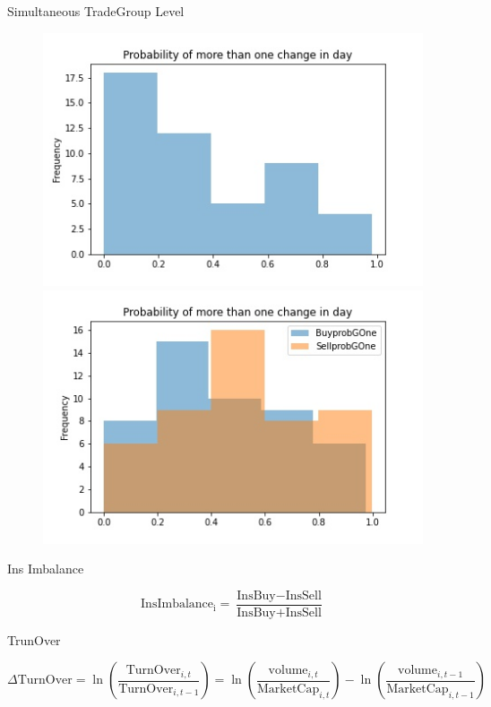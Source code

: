 \documentclass{beamer}
\begin{document}
	\begin{frame}{Simultaneous Trade}{Group Level}
		
		\begin{figure}
			\centering
			\includegraphics[width=0.45\linewidth]{../Trade/MorethanOneProb}
			\includegraphics[width=0.45\linewidth]{../Trade/Buy-SellMorethanOneProb}
			
			\label{fig:morethanoneprob}
		\end{figure}
		
	\end{frame}
	
	
	\begin{frame}{Ins Imbalance}

			 \begin{equation*}
				 \text{InsImbalance}_\text{i} = \frac{\text{InsBuy} - \text{InsSell}}{\text{InsBuy} + \text{InsSell}}
			\end{equation*}

				\begin{table}[htbp]
			\centering
			\resizebox{1\textheight}{!}{
				
			}
		\end{table}
	
	\end{frame}
	\begin{frame}{TrunOver}
	
	\begin{equation*}
		\Delta \text{TurnOver} = \ln(\frac{\text{TurnOver}_{i,t}}{\text{TurnOver}_{i,t-1}}) = 
		\ln({\frac{\text{volume}_{i,t}}{\text{MarketCap}_{i,t}}}) - \ln({\frac{\text{volume}_{i,t-1}}{\text{MarketCap}_{i,t-1}}})
	\end{equation*}
	
	\begin{table}[htbp]
		\centering
		\resizebox{0.75\textheight}{!}{
			
		}
	\end{table}
	
\end{frame}
\end{document}
